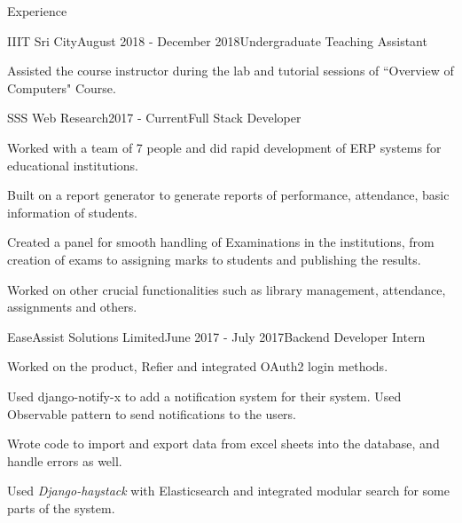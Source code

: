 \documentclass{resume} %
\begin{document}
\begin{rSection}{Experience}

\begin{rSubsection}{IIIT Sri City}{August 2018 - December 2018}{Undergraduate Teaching Assistant}{}
\item Assisted the course instructor during the lab and tutorial sessions of ``Overview of Computers" Course. 
\end{rSubsection}



\begin{rSubsection}{SSS Web Research}{2017 - Current}{Full Stack Developer}{}
\item Worked with a team of 7 people and did rapid development of ERP systems for educational institutions.
\item Built on a report generator to generate reports of performance, attendance, basic information of students.
\item Created a panel for smooth handling of Examinations in the institutions, from creation of exams to assigning marks to students and publishing the results.
\item Worked on other crucial functionalities such as library management, attendance, assignments and others.
\end{rSubsection}

\begin{rSubsection}{EaseAssist Solutions Limited}{June 2017 - July 2017}{Backend Developer Intern}{}
\item Worked on the product, Refier and integrated OAuth2 login methods.
\item Used django-notify-x to add a notification system for their system. Used Observable pattern to send notifications to the users. 
\item Wrote code to import and export data from excel sheets into the database, and handle errors as well.
\item Used \textit{Django-haystack} with Elasticsearch and integrated modular search for some parts of the system.
\end{rSubsection}

\end{rSection}


\end{document}

